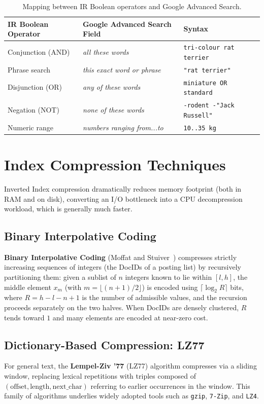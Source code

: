 \begin{table}[H]
\centering
\small
\begin{tabularx}{\textwidth}{>{\raggedright\arraybackslash}p{3.2cm} >{\raggedright\arraybackslash}p{3.8cm} >{\raggedright\arraybackslash}X}
\toprule
\textbf{IR Boolean Operator} & \textbf{Google Advanced Search Field} & \textbf{Syntax} \\
\midrule
Conjunction (AND) & \textit{all these words} & \texttt{tri-colour rat terrier} \\
Phrase search & \textit{this exact word or phrase} & \texttt{"rat terrier"} \\
Disjunction (OR) & \textit{any of these words} & \texttt{miniature OR standard} \\
Negation (NOT) & \textit{none of these words} & \texttt{-rodent -"Jack Russell"} \\
Numeric range & \textit{numbers ranging from...to} & \texttt{10..35 kg} \\
\bottomrule
\end{tabularx}
\caption{Mapping between IR Boolean operators and Google Advanced Search.}
\label{tab:google-advanced-search-en}
\end{table}

\FloatBarrier
\section{Index Compression Techniques}

Inverted Index compression dramatically reduces memory footprint (both in RAM and on disk), converting an I/O bottleneck into a CPU decompression workload, which is generally much faster.

\subsection{Binary Interpolative Coding}
\textbf{Binary Interpolative Coding} (Moffat and Stuiver~\cite{moffat2000}) compresses strictly increasing sequences of integers (the DocIDs of a posting list) by recursively partitioning them: given a sublist of $n$ integers known to lie within $[l, h]$, the middle element $x_m$ (with $m = \lfloor (n+1)/2 \rfloor$) is encoded using $\lceil \log_2 R \rceil$ bits, where $R = h - l - n + 1$ is the number of admissible values, and the recursion proceeds separately on the two halves. When DocIDs are densely clustered, $R$ tends toward $1$ and many elements are encoded at near-zero cost.

\subsection{Dictionary-Based Compression: LZ77}
For general text, the \textbf{Lempel-Ziv '77} (LZ77) algorithm compresses via a sliding window, replacing lexical repetitions with triples composed of $(\text{offset}, \text{length}, \text{next\_char})$ referring to earlier occurrences in the window. This family of algorithms underlies widely adopted tools such as \texttt{gzip}, \texttt{7-Zip}, and \texttt{LZ4}.

